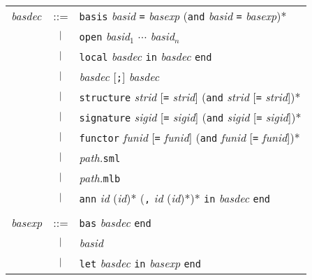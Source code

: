 \begin{latexonly}
\begin{center}
\begin{tabular}{lcl}
{\it basdec} 
& ::=    & {\tt basis} {\it basid} {\tt =} {\it basexp}
            ({\tt and} {\it basid} {\tt =} {\it basexp})* \\
& $\ |\ $ & {\tt open} {\it basid}$_1$ $\cdots$ {\it basid}$_n$ \\
& $\ |\ $ & {\tt local} {\it basdec} {\tt in} {\it basdec} {\tt end} \\
& $\ |\ $ & {\it basdec} [{\tt;}] {\it basdec} \\
& $\ |\ $ & {\tt structure} {\it strid} [{\tt =} {\it strid}] 
                ({\tt and} {\it strid} [{\tt =} {\it strid}])* \\
& $\ |\ $ & {\tt signature} {\it sigid} [{\tt =} {\it sigid}] 
                ({\tt and} {\it sigid} [{\tt =} {\it sigid}])* \\
& $\ |\ $ &   {\tt functor} {\it funid} [{\tt =} {\it funid}] 
                ({\tt and} {\it funid} [{\tt =} {\it funid}])* \\
& $\ |\ $ & {\it path.}{\tt sml} \\
& $\ |\ $ & {\it path.}{\tt mlb} \\
& $\ |\ $ & {\tt ann} {\it id} ({\it id})* ({\tt ,}  {\it id} ({\it id})*)*
           {\tt in} {\it basdec} {\tt end} \\
\\
{\it basexp}
& ::=    & {\tt bas} {\it basdec} {\tt end} \\
& $\ |\ $ & {\it basid} \\
& $\ |\ $ & {\tt let} {\it basdec} {\tt in} {\it basexp} {\tt end}
\end{tabular}
\end{center}
\end{latexonly}
